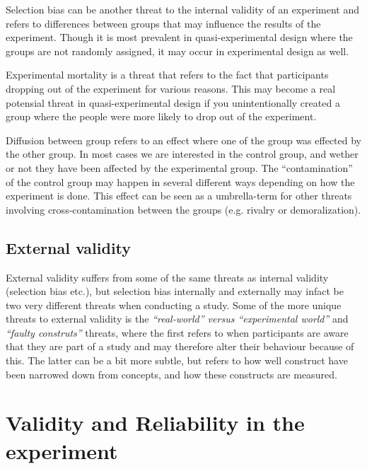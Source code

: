 	\bigskip\noindent
	Selection bias can be another threat to the internal validity of an experiment and refers to differences between groups that may influence the results of the experiment. Though it is most prevalent in quasi-experimental design where the groups are not randomly assigned, it may occur in experimental design as well. 
	
	\bigskip\noindent
	Experimental mortality is a threat that refers to the fact that participants dropping out of the experiment for various reasons. This may become a real potensial threat in quasi-experimental design if you unintentionally created a group where the people were more likely to drop out of the experiment.
	
	\bigskip\noindent
	Diffusion between group refers to an effect where one of the group was effected by the other group. In most cases we are interested in the control group, and wether or not they have been affected by the experimental group. The "`contamination"' of the control group may happen in several different ways depending on how the experiment is done. 
	This effect can be seen as a umbrella-term for other threats involving cross-contamination between the groups (e.g. rivalry or demoralization).
	
	\subsection{External validity}
	External validity suffers from some of the same threats as internal validity (selection bias etc.), but selection bias internally and externally may infact be two very different threats when conducting a study.
	Some of the more unique threats to external validity is the \textit{"`real-world"' versus "`experimental world"'} and \textit{"`faulty construts"'} threats, where the first refers to when participants are aware that they are part of a study and may therefore alter their behaviour because of this. The latter can be a bit more subtle, but refers to how well construct have been narrowed down from concepts, and how these constructs are measured.

\section{Validity and Reliability in the experiment}